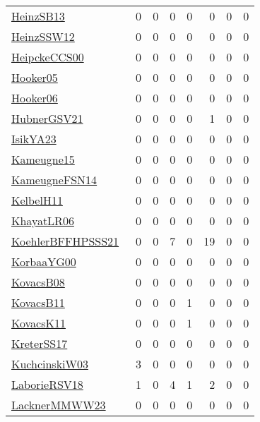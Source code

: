 {\begin{longtable}{l*{7}{r}}
\href{articles/HeinzSB13.pdf}{HeinzSB13}~\cite{HeinzSB13} & 0 & 0 & 0 & 0 & 0 & 0 & 0\\
\href{articles/HeinzSSW12.pdf}{HeinzSSW12}~\cite{HeinzSSW12} & 0 & 0 & 0 & 0 & 0 & 0 & 0\\
\href{articles/HeipckeCCS00.pdf}{HeipckeCCS00}~\cite{HeipckeCCS00} & 0 & 0 & 0 & 0 & 0 & 0 & 0\\
\href{articles/Hooker05.pdf}{Hooker05}~\cite{Hooker05} & 0 & 0 & 0 & 0 & 0 & 0 & 0\\
\href{articles/Hooker06.pdf}{Hooker06}~\cite{Hooker06} & 0 & 0 & 0 & 0 & 0 & 0 & 0\\
\href{articles/HubnerGSV21.pdf}{HubnerGSV21}~\cite{HubnerGSV21} & 0 & 0 & 0 & 0 & 1 & 0 & 0\\
\href{articles/IsikYA23.pdf}{IsikYA23}~\cite{IsikYA23} & 0 & 0 & 0 & 0 & 0 & 0 & 0\\
\href{articles/Kameugne15.pdf}{Kameugne15}~\cite{Kameugne15} & 0 & 0 & 0 & 0 & 0 & 0 & 0\\
\href{articles/KameugneFSN14.pdf}{KameugneFSN14}~\cite{KameugneFSN14} & 0 & 0 & 0 & 0 & 0 & 0 & 0\\
\href{articles/KelbelH11.pdf}{KelbelH11}~\cite{KelbelH11} & 0 & 0 & 0 & 0 & 0 & 0 & 0\\
\href{articles/KhayatLR06.pdf}{KhayatLR06}~\cite{KhayatLR06} & 0 & 0 & 0 & 0 & 0 & 0 & 0\\
\href{articles/KoehlerBFFHPSSS21.pdf}{KoehlerBFFHPSSS21}~\cite{KoehlerBFFHPSSS21} & 0 & 0 & 7 & 0 & 19 & 0 & 0\\
\href{articles/KorbaaYG00.pdf}{KorbaaYG00}~\cite{KorbaaYG00} & 0 & 0 & 0 & 0 & 0 & 0 & 0\\
\href{articles/KovacsB08.pdf}{KovacsB08}~\cite{KovacsB08} & 0 & 0 & 0 & 0 & 0 & 0 & 0\\
\href{articles/KovacsB11.pdf}{KovacsB11}~\cite{KovacsB11} & 0 & 0 & 0 & 1 & 0 & 0 & 0\\
\href{articles/KovacsK11.pdf}{KovacsK11}~\cite{KovacsK11} & 0 & 0 & 0 & 1 & 0 & 0 & 0\\
\href{articles/KreterSS17.pdf}{KreterSS17}~\cite{KreterSS17} & 0 & 0 & 0 & 0 & 0 & 0 & 0\\
\href{articles/KuchcinskiW03.pdf}{KuchcinskiW03}~\cite{KuchcinskiW03} & 3 & 0 & 0 & 0 & 0 & 0 & 0\\
\href{articles/LaborieRSV18.pdf}{LaborieRSV18}~\cite{LaborieRSV18} & 1 & 0 & 4 & 1 & 2 & 0 & 0\\
\href{articles/LacknerMMWW23.pdf}{LacknerMMWW23}~\cite{LacknerMMWW23} & 0 & 0 & 0 & 0 & 0 & 0 & 0\\

\end{longtable}}
